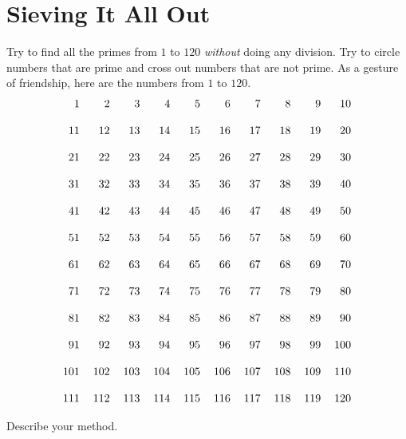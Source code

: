 \newpage
\section{Sieving It All Out}\label{A:Sieve}

\begin{prob} 
Try to find all the primes from $1$ to $120$ \textit{without}
doing any division.  Try to circle numbers that are prime and 
cross out numbers that are not prime.  
As a gesture of friendship, here are the numbers from $1$ to $120$.
\[
\begin{tabular}{r r r r r r r r r r}

  1 &   2 &   3 &   4 &   5 &   6 &   7 &   8 &   9 &  10\\
  \\
 11 &  12 &  13 &  14 &  15 &  16 &  17 &  18 &  19 &  20\\
 \\
 21 &  22 &  23 &  24 &  25 &  26 &  27 &  28 &  29 &  30\\
 \\
 31 &  32 &  33 &  34 &  35 &  36 &  37 &  38 &  39 &  40\\
 \\
 41 &  42 &  43 &  44 &  45 &  46 &  47 &  48 &  49 &  50\\
 \\
 51 &  52 &  53 &  54 &  55 &  56 &  57 &  58 &  59 &  60\\
 \\
 61 &  62 &  63 &  64 &  65 &  66 &  67 &  68 &  69 &  70\\
 \\
 71 &  72 &  73 &  74 &  75 &  76 &  77 &  78 &  79 &  80\\
 \\
 81 &  82 &  83 &  84 &  85 &  86 &  87 &  88 &  89 &  90\\
 \\
 91 &  92 &  93 &  94 &  95 &  96 &  97 &  98 &  99 & 100\\
 \\
101 & 102 & 103 & 104 & 105 & 106 & 107 & 108 & 109 & 110\\
\\
111 & 112 & 113 & 114 & 115 & 116 & 117 & 118 & 119 & 120\\
\end{tabular}
\]

Describe your method.  
\end{prob}

\newpage

